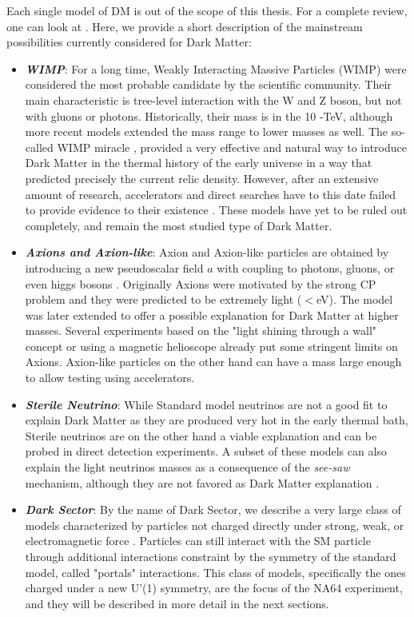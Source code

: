 Each single model of DM is out of the scope of this thesis. For a complete review, one can look at \cite{battaglieri2017cosmic,Profumo:2019ujg,HAMBYE2020135553,alex2016dark,review-particle-physics,Feng:2010gw}. Here, we provide a short description of the mainstream possibilities currently considered for Dark Matter:
\begin{itemize}
\item \textbf{\textit{WIMP}}: For a long time, Weakly Interacting Massive Particles (WIMP) were considered the most probable candidate by the scientific community. Their main characteristic is tree-level interaction with the W and Z boson, but not with gluons or photons. Historically, their mass is in the 10 \gev-\si{\tera\electronvolt}, although more recent models extended the mass range to lower masses as well. The so-called WIMP miracle \cite{Chang:2013oia}, provided a very effective and natural way to introduce Dark Matter in the thermal history of the early universe in a way that predicted precisely the current relic density. However, after an extensive amount of research, accelerators and direct searches have to this date failed to provide evidence to their existence \cite{Arcadi:2017kky}. These models have yet to be ruled out completely, and remain the most studied type of Dark Matter.
\item \textbf{\textit{Axions and Axion-like}}: Axion and Axion-like particles are obtained by introducing a new pseudoscalar field $a$ with coupling to photons, gluons, or even higgs bosons \cite{Marsh:2015xka}. Originally Axions were motivated by the strong CP problem and they were predicted to be extremely light ($<$\si{\electronvolt}). The model was later extended to offer a possible explanation for Dark Matter at higher masses. Several experiments based on the "light shining through a wall" concept or using a magnetic helioscope \cite{annurev.nucl.56.080805.140513} already put some stringent limits on Axions. Axion-like particles on the other hand can have a mass large enough to allow testing using accelerators.
\item \textbf{\textit{Sterile Neutrino}}: While Standard model neutrinos are not a good fit to explain Dark Matter as they are produced very hot in the early thermal bath, Sterile neutrinos are on the other hand a viable explanation and can be probed in direct detection experiments. A subset of these models can also explain the light neutrinos masses as a consequence of the \textit{see-saw} mechanism, although they are not favored as Dark Matter explanation \cite{Feng:2010gw}. 
\item \textbf{\textit{Dark Sector}}: By the name of Dark Sector, we describe a very large class of models characterized by particles not charged directly under strong, weak, or electromagnetic force \cite{alex2016dark}. Particles can still interact with the SM particle through additional interactions constraint by the symmetry of the standard model, called "portals" interactions. This class of models, specifically the ones charged under a new U'(1) symmetry, are the focus of the NA64 experiment, and they will be described in more detail in the next sections.
\end{itemize}

